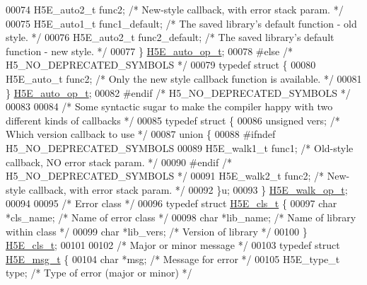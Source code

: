 \begin{DoxyCode}
00074     H5E\_auto2\_t func2;      \textcolor{comment}{/* New-style callback, with error stack param. */}
00075     H5E\_auto1\_t func1\_default;      \textcolor{comment}{/* The saved library's default function - old style. */}
00076     H5E\_auto2\_t func2\_default;      \textcolor{comment}{/* The saved library's default function - new style. */}
00077 \} \hyperlink{struct_h5_e__auto__op__t}{H5E\_auto\_op\_t};
00078 \textcolor{preprocessor}{#else }\textcolor{comment}{/* H5\_NO\_DEPRECATED\_SYMBOLS */}\textcolor{preprocessor}{}
00079 \textcolor{keyword}{typedef} \textcolor{keyword}{struct }\{
00080     H5E\_auto\_t  func2;      \textcolor{comment}{/* Only the new style callback function is available. */}
00081 \} \hyperlink{struct_h5_e__auto__op__t}{H5E\_auto\_op\_t};
00082 \textcolor{preprocessor}{#endif }\textcolor{comment}{/* H5\_NO\_DEPRECATED\_SYMBOLS */}\textcolor{preprocessor}{ }
00083 
00084 \textcolor{comment}{/* Some syntactic sugar to make the compiler happy with two different kinds of callbacks */}
00085 \textcolor{keyword}{typedef} \textcolor{keyword}{struct }\{
00086     \textcolor{keywordtype}{unsigned} vers;              \textcolor{comment}{/* Which version callback to use */}
00087     \textcolor{keyword}{union }\{
00088 \textcolor{preprocessor}{#ifndef H5\_NO\_DEPRECATED\_SYMBOLS}
00089         H5E\_walk1\_t func1;      \textcolor{comment}{/* Old-style callback, NO error stack param. */}
00090 \textcolor{preprocessor}{#endif }\textcolor{comment}{/* H5\_NO\_DEPRECATED\_SYMBOLS */}\textcolor{preprocessor}{}
00091         H5E\_walk2\_t func2;      \textcolor{comment}{/* New-style callback, with error stack param. */}
00092     \}u;
00093 \} \hyperlink{struct_h5_e__walk__op__t}{H5E\_walk\_op\_t};
00094 
00095 \textcolor{comment}{/* Error class */}
00096 \textcolor{keyword}{typedef} \textcolor{keyword}{struct }\hyperlink{struct_h5_e__cls__t}{H5E\_cls\_t} \{
00097     \textcolor{keywordtype}{char} *cls\_name;             \textcolor{comment}{/* Name of error class */}
00098     \textcolor{keywordtype}{char} *lib\_name;             \textcolor{comment}{/* Name of library within class */}
00099     \textcolor{keywordtype}{char} *lib\_vers;             \textcolor{comment}{/* Version of library */}
00100 \} \hyperlink{struct_h5_e__cls__t}{H5E\_cls\_t};
00101 
00102 \textcolor{comment}{/* Major or minor message */}
00103 \textcolor{keyword}{typedef} \textcolor{keyword}{struct }\hyperlink{struct_h5_e__msg__t}{H5E\_msg\_t} \{
00104     \textcolor{keywordtype}{char}        *msg;           \textcolor{comment}{/* Message for error */}
00105     H5E\_type\_t   type;          \textcolor{comment}{/* Type of error (major or minor) */}

\end{DoxyCode}
